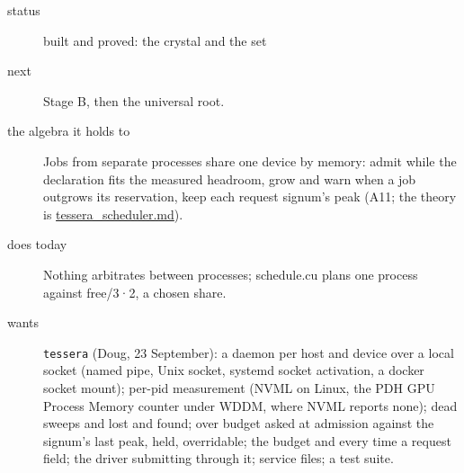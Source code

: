 \begin{description}
\item[{status}] built and proved: the crystal and the set
\item[{next}] Stage B, then the universal root.
\end{description}

\begin{description}
\item[{the algebra it holds to}] Jobs from separate processes share one device by memory: admit while the declaration fits the measured headroom, grow and warn when a job outgrows its reservation, keep each request signum's peak (A11; the theory is \hyperref[chap:tessera-scheduler]{tessera\_\allowbreak{}scheduler.md}).
\item[{does today}] Nothing arbitrates between processes; schedule.cu plans one process against free/3·2, a chosen share.
\item[{wants}] \texttt{tessera} (Doug, 23 September): a daemon per host and device over a local socket (named pipe, Unix socket, systemd socket activation, a docker socket mount); per-pid measurement (NVML on Linux, the PDH GPU Process Memory counter under WDDM, where NVML reports none); dead sweeps and lost and found; over budget asked at admission against the signum's last peak, held, overridable; the budget and every time a request field; the driver submitting through it; service files; a test suite.

\end{description}
